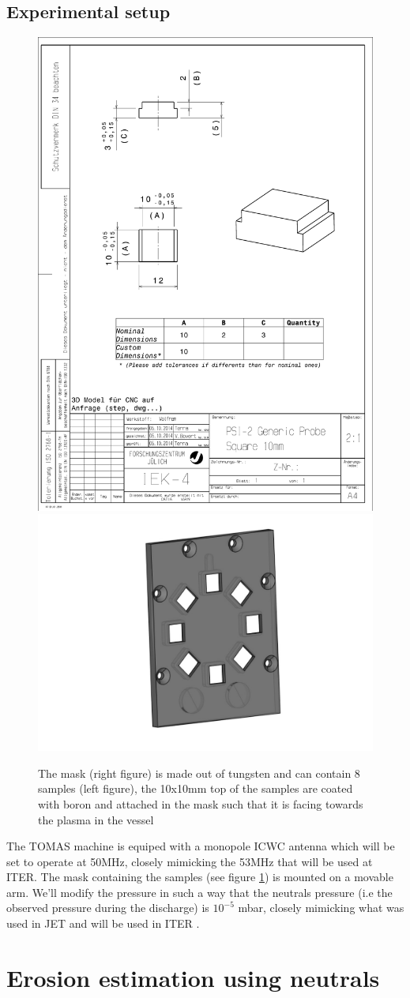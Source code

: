 \documentclass{article}
\begin{document}
\subsection{Experimental setup}
\begin{figure}[ht]
    \centering
    \includegraphics[height=0.24\textwidth]{figures/Sample.pdf}
    \includegraphics[height=0.24\textwidth]{figures/mask.pdf}
    \caption{The mask (right figure) is made out of tungsten and can contain 8 samples (left figure), 
    the 10x10mm top of the samples are coated with boron and attached in the mask such that it is facing towards    the plasma in the vessel}
    \label{fig:samples+mask}
\end{figure}
The TOMAS machine \cite{TOMAS} is equiped with a monopole ICWC antenna which
will be set to operate at 50MHz, closely mimicking the 53MHz that will be used
at ITER.  The mask containing the samples (see figure \ref{fig:samples+mask})
is mounted on a movable arm.  We'll modify the pressure in such a way that the
neutrals pressure (i.e the observed pressure during the discharge) is $10^{-5}$
mbar, closely mimicking what was used in JET and will be used in ITER \cite{DOUAI}.
\section{Erosion estimation using neutrals}
\end{document}
